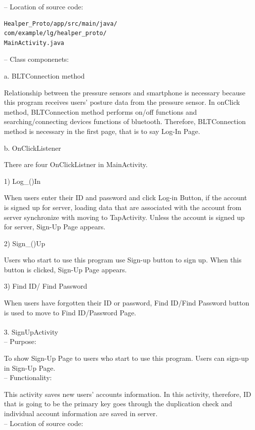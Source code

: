 \documentclass[conference]{IEEEtran}
\begin{document}
 -- Location of source code:
 
\begin{verbatim}
Healper_Proto/app/src/main/java/
com/example/lg/healper_proto/
MainActivity.java
\end{verbatim}

 -- Class componenets:

a. BLTConnection method

Relationship between the pressure sensors and smartphone is necessary because this program receives users' posture data from the pressure sensor. In onClick method, BLTConnection method performs on/off functions and searching/connecting devices functions of bluetooth. Therefore, BLTConnection method is necessary in the first page, that is to say Log-In Page. 

b. OnClickListener

There are four OnClickListner in MainActivity.

  1) Log\_()In
  
When users enter their ID and password and click Log-in Button, if the account is signed up for server, loading data that are associated with the account from server synchronize with moving to TapActivity. Unless the account is signed up for server, Sign-Up Page appears.

  2) Sign\_()Up
  
Users who start to use this program use Sign-up button to sign up. When this button is clicked, Sign-Up Page appears.

  3) Find ID/ Find Password
  
When users have forgotten their ID or password, Find ID/Find Password button is used to move to Find ID/Password Page.\\\\

3.	SignUpActivity\\

 --	Purpose:

To show Sign-Up Page to users who start to use this program. Users can sign-up in Sign-Up Page. \\

 --	Functionality:

This activity saves new users' accounts information. In this activity, therefore, ID that is going to be the primary key goes through the duplication check and individual account information are saved in server.\\
 
 --	Location of source code:
\end{document}

